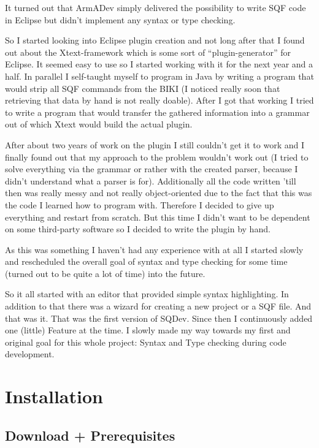 \documentclass[twoside=false]{scrbook}
\newcommand{\SQDev}{SQDev\xspace}
\newcommand{\eclipse}{Eclipse\xspace}
\begin{document}
	It turned out that ArmADev simply delivered the possibility to write SQF code in \eclipse but didn't implement any syntax or type checking.
	
	So I started looking into \eclipse plugin creation and not long after that I found out about the Xtext-framework which is some sort of “plugin-generator” for \eclipse. It seemed easy to use so I started working with it for the next year and a half. In parallel I self-taught myself to program in Java by writing a program that would strip all SQF commands from the BIKI (I noticed really soon that retrieving that data by hand is not really doable). After I got that working I tried to write a program that would transfer the gathered information into a grammar out of which Xtext would build the actual plugin.
	
	After about two years of work on the plugin I still couldn't get it to work and I finally found out that my approach to the problem wouldn't work out (I tried to solve everything via the grammar or rather with the created parser, because I didn't understand what a parser is for). Additionally all the code written 'till then was really messy and not really object-oriented due to the fact that this was the code I learned how to program with. Therefore I decided to give up everything and restart from scratch. But this time I didn't want to be dependent on some third-party software so I decided to write the plugin by hand.
	
	As this was something I haven't had any experience with at all I started slowly and rescheduled the overall goal of syntax and type checking for some time (turned out to be quite a lot of time) into the future.
	
	So it all started with an editor that provided simple syntax highlighting. In addition to that there was a wizard for creating a new project or a SQF file. And that was it. That was the first version of \SQDev. Since then I continuously  added one (little) Feature at the time. I slowly made my way towards my first and original goal for this whole project: Syntax and Type checking during code development.
	
	
	\mainmatter
	
	
	\chapter{Installation}
	\label{ch:Installation}
	
	
	\section{Download + Prerequisites}
\end{document}
